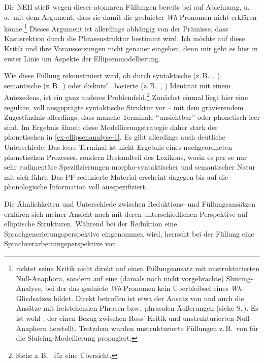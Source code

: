 Die NEH stie\ss\ wegen dieser atomaren Füllungen bereits bei \cite{Ross:69} auf Ablehnung, u.\,a.\ mit dem Argument, dass sie damit die  gesluicter \textit{Wh}-Pronomen nicht erklären könne.\footnote{\cite{Ross:69} richtet seine Kritik nicht direkt auf einen Füllungsansatz mit unstrukturierten Null-Anaphora, sondern auf eine (damals noch nicht vorgebrachte) Sluicing-Analyse, bei der das gesluicte \textit{Wh}-Pronomen kein Überbleibsel eines \textit{Wh}-Gliedsatzes bildet. Direkt betroffen ist etwa der Ansatz von \cite{Riemsdijk:78} und auch die Ansätze mit freistehenden Phrasen bzw.\ phrasalen Äu\ss erungen (siehe S.\,\pageref{ex-freistehende-phrasen}). Es ist wohl \cite{Wasow:72}, der einen Bezug zwischen Ross' Kritik und unstrukturierten Null-Anaphern herstellt. Trotzdem wurden unstrukturierte Füllungen z.\,B.\ von \cite{Chung:etal:95} für die Sluicing-Modellierung propagiert. } Dieses Argument ist allerdings abhängig von der Prämisse, dass Kasusrektion durch die Phrasenstruktur bestimmt wird. Ich möchte auf diese Kritik und ihre Voraussetzungen nicht genauer eingehen, denn mir geht es hier in erster Linie um Aspekte der Ellipsenmodellierung. 
 
Wie diese Füllung rekonstruiert wird, ob durch syntaktische (z.\,B.\ \citealt{Fiengo:May:94}, \citealt{Chung:etal:95}), semantische (z.\,B.\ \citealt{Dalrymple:etal:91}) oder diskurs"=basierte (z.\,B.\ \citealt{Hardt:93,Hardt:99}, \citealt{Hardt:Romero:04}) Identität mit einem Antezedens, ist ein ganz anderes Problemfeld.\footnote{Siehe z.\,B.\ \citet[Kapitel~3]{Schlangen:03} für eine Übersicht.} Zunächst einmal liegt hier eine reguläre, voll ausgeprägte syntaktische Struktur vor -- mit dem gravierendem Zugeständnis allerdings, dass manche Terminale "`unsichtbar"' oder phonetisch leer sind. Im Ergebnis ähnelt diese Modellierungstrategie daher stark der phonetischen  in \ref{ex-ellipsenanalyse-1}. Es gibt allerdings auch deutliche Unterschiede: Das leere Terminal ist nicht Ergebnis eines nachgeordneten phonetischen Prozesses, sondern Bestandteil des Lexikons, worin es per se nur sehr rudimentäre Spezifizierungen morpho-syntaktischer und semantischer Natur mit sich führt. Das PF-reduzierte Material erscheint dagegen bis auf die phonologische Information voll ausspezifiziert. 

Die Ähnlichkeiten und Unterschiede zwischen Reduktions- und Füllungsansätzen erklären sich meiner Ansicht nach mit deren unterschiedlichen Perspektive auf elliptische Strukturen. Während bei der Reduktion eine Sprachgenerierungsperspektive eingenommen wird, herrscht bei der Füllung eine Sprachverarbeitungsperspektive vor.

